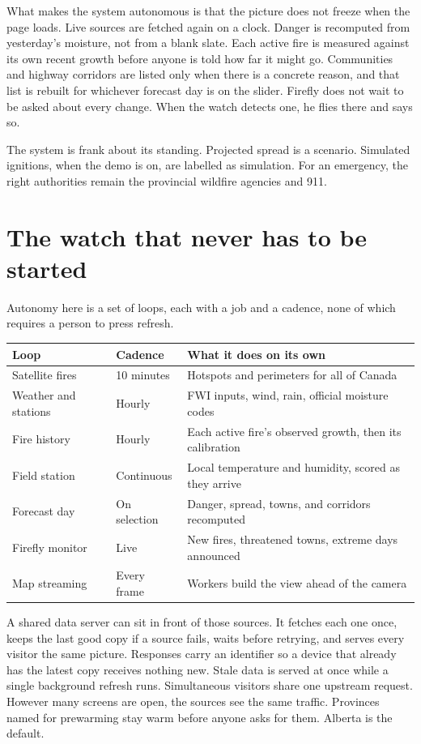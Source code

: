 \documentclass[11pt,a4paper]{article}
\begin{document}
What makes the system autonomous is that the picture does not freeze when the page loads. Live sources are fetched again on a clock. Danger is recomputed from yesterday's moisture, not from a blank slate. Each active fire is measured against its own recent growth before anyone is told how far it might go. Communities and highway corridors are listed only when there is a concrete reason, and that list is rebuilt for whichever forecast day is on the slider. Firefly does not wait to be asked about every change. When the watch detects one, he flies there and says so.

The system is frank about its standing. Projected spread is a scenario. Simulated ignitions, when the demo is on, are labelled as simulation. For an emergency, the right authorities remain the provincial wildfire agencies and 911.

\section{The watch that never has to be started}

Autonomy here is a set of loops, each with a job and a cadence, none of which requires a person to press refresh.

\begin{center}
\renewcommand{\arraystretch}{1.15}
\begin{tabular}{@{}llp{7.4cm}@{}}
\toprule
\textbf{Loop} & \textbf{Cadence} & \textbf{What it does on its own} \\
\midrule
Satellite fires & 10 minutes & Hotspots and perimeters for all of Canada \\
Weather and stations & Hourly & FWI inputs, wind, rain, official moisture codes \\
Fire history & Hourly & Each active fire's observed growth, then its calibration \\
Field station & Continuous & Local temperature and humidity, scored as they arrive \\
Forecast day & On selection & Danger, spread, towns, and corridors recomputed \\
Firefly monitor & Live & New fires, threatened towns, extreme days announced \\
Map streaming & Every frame & Workers build the view ahead of the camera \\
\bottomrule
\end{tabular}
\end{center}

A shared data server can sit in front of those sources. It fetches each one once, keeps the last good copy if a source fails, waits before retrying, and serves every visitor the same picture. Responses carry an identifier so a device that already has the latest copy receives nothing new. Stale data is served at once while a single background refresh runs. Simultaneous visitors share one upstream request. However many screens are open, the sources see the same traffic. Provinces named for prewarming stay warm before anyone asks for them. Alberta is the default.
\end{document}

